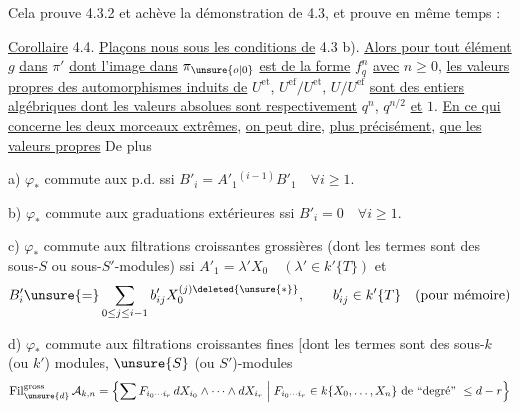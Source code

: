Cela prouve 4.3.2 et achève la démonstration de 4.3, et prouve en même temps :

\uline{Corollaire} 4.4. \uline{Plaçons nous sous les conditions de} 4.3 b). \uline{Alors pour tout élément} $g$ \uline{dans} $\pi'$ \uline{dont l'image dans} $\pi_{\unsure{o|0}}$ \uline{est de la forme} $f_q^n$ \uline{avec} $n\geq0$, \uline{les valeurs propres des automorphismes induits de} $U^{\mathrm{et}}$, $U^{\mathrm{ef}}/U^{\mathrm{et}}$, $U/U^{\mathrm{ef}}$ \uline{sont des entiers algébriques dont les valeurs absolues sont respectivement} $q^n$, $q^{n/2}$ \uline{et} $1$. \uline{En ce qui concerne les deux morceaux extrêmes}, \uline{on peut dire}, \uline{plus précisément}, \uline{que les valeurs propres}
De plus

a) $\varphi_*$ commute aux p.d. ssi $B'_i=A'_1{}^{(i-1)}B'_1\quad\forall i\geq1$.

b) $\varphi_*$ commute aux graduations extérieures ssi $B'_i=0\quad\forall i\geq1$.

c) $\varphi_*$ commute aux filtrations croissantes grossières
(dont les termes sont des sous-$S$ ou sous-$S'$-modules) ssi
$A'_1=\lambda'X_0\quad(\lambda'\in k'\{T\})$ et
\[
 B'_i\unsure{=}\sum_{0\leq j\leq i-1}b'_{ij}X_0^{(j)\deleted{\unsure{*}}},
 \qquad b'_{ij}\in k'\{T\}\quad\text{(pour mémoire)}
\]

d) $\varphi_*$ commute aux filtrations  croissantes
fines [dont les termes sont des sous-$k$ (ou $k'$)
modules,  $\unsure{S}$ (ou $S'$)-modules
\[
 \operatorname{Fil}^{\mathrm{gross}}_{\unsure{d}} \mathcal A_{k,n}
 =\left\{\sum F_{i_0\cdots i_r}\,dX_{i_0}\wedge\cdots\wedge dX_{i_r}
 \;\middle|\;F_{i_0\cdots i_r}\in k\{X_0,\ldots,X_n\}
 \text{ de ``degré'' }\leq d-r\right\}
\]

